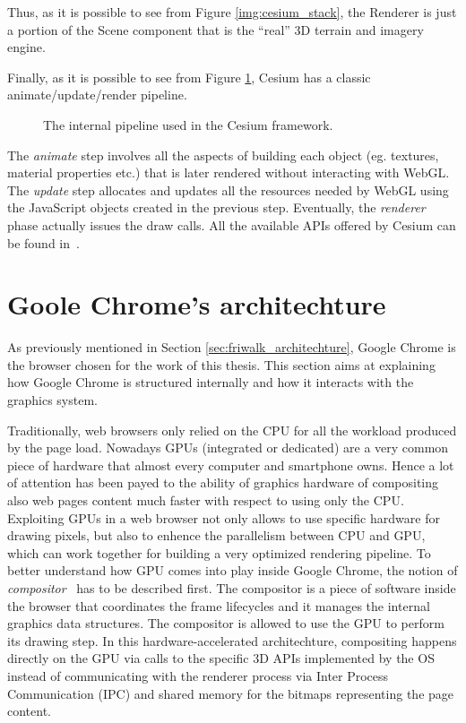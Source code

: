 Thus, as it is possible to see from Figure \ref{img:cesium_stack},
the Renderer is just a portion of the Scene component that is the ``real'' 3D
terrain and imagery engine.

Finally, as it is possible to see from Figure \ref{img:cesium_pipeline},
Cesium has a classic animate/update/render pipeline.
\begin{figure}[!htb]
    \caption{The internal pipeline used in the Cesium framework.}
    \label{img:cesium_pipeline}
\end{figure}

The \emph{animate} step involves all the aspects of building each object (eg.
textures, material properties etc.) that is later rendered without interacting with
WebGL. The \emph{update} step allocates and updates all the resources needed by
WebGL using the JavaScript objects created in the previous step. Eventually, the
\emph{renderer} phase actually issues the draw calls. All the available APIs
offered by Cesium can be found in~\cite{cesiumapi}.


\section{Goole Chrome's architechture}
As previously mentioned in Section \ref{sec:friwalk_architechture}, Google Chrome
is the browser chosen for the work of this thesis. This section aims at explaining
how Google Chrome is structured internally and how it interacts with the graphics
system.

Traditionally, web browsers only relied on the CPU for all the workload produced
by the page load. Nowadays GPUs (integrated or dedicated) are a very common piece
of hardware that almost every computer and smartphone owns. Hence a lot of attention
has been payed to the ability of graphics hardware of compositing also web pages
content much faster with respect to using only the CPU. Exploiting GPUs in a web
browser not only allows to use specific hardware for drawing pixels, but also to
enhence the parallelism between CPU and GPU, which can work together for building
a very optimized rendering pipeline. To better understand how GPU comes into play
inside Google Chrome, the notion of \emph{compositor}~\cite{gpucompositing} has to
be described first.
The compositor is a piece of software inside the browser that coordinates the frame
lifecycles and it manages the internal graphics data structures. The compositor
is allowed to use the GPU to perform its drawing step. In this hardware-accelerated
architechture, compositing happens directly on the GPU via calls to the specific 3D
APIs implemented by the OS instead of communicating with the renderer process via
Inter Process Communication (IPC) and shared memory for the bitmaps representing
the page content.

